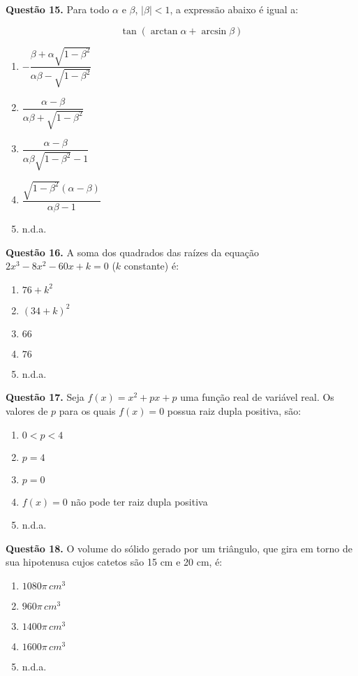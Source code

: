 \documentclass[11pt]{article}
\begin{document}
\textbf{Questão 15.} Para todo $\alpha$ e $\beta$, $|\beta| < 1$, a expressão abaixo é igual a:

$$
\tan (\arctan \alpha + \arcsin \beta)
$$


\begin{enumerate}[\bf A (\quad)]
    \item $-\dfrac{\beta + \alpha \sqrt{1-\beta^2}}{\alpha \beta - \sqrt{1 - \beta^2}}$
    \item $\dfrac{\alpha - \beta}{\alpha \beta + \sqrt{1 - \beta^2}}$
    \item $\dfrac{\alpha - \beta}{\alpha \beta \sqrt{1 - \beta^2} - 1}$
    \item $\dfrac{\sqrt{1-\beta^2}(\alpha - \beta)}{\alpha \beta - 1}$
    \item n.d.a.
\end{enumerate}

\textbf{Questão 16.} A soma dos quadrados das raízes da equação $2x^3 - 8x^2 - 60x + k = 0$ ($k$ constante) é:

\begin{multicols}{3}
    \begin{enumerate}[\bf A (\quad)]
        \item $76 + k^2$
        \item $(34 + k)^2$
        \item $66$
        \item $76$
        \item n.d.a.
    \end{enumerate}
\end{multicols}

\textbf{Questão 17.} Seja  $f(x)  =  x^2  +  px  +  p$  uma  função  real  de  variável  real.  Os  valores  de  $p$  para  os  quais  $f(x)  =  0$  possua  raiz  dupla positiva, são:

\begin{enumerate}[\bf A (\quad)]
    \item $0 < p < 4$
    \item $p = 4$
    \item $p = 0$
    \item $f(x) = 0$ não pode ter raiz dupla positiva
    \item n.d.a.
\end{enumerate}

\textbf{Questão 18.} O volume do sólido gerado por um triângulo, que gira em torno de sua hipotenusa cujos catetos são 15 cm e 20 cm, é:


\begin{enumerate}[\bf A (\quad)]
    \item $1080\pi \, cm^3$
    \item $960\pi \, cm^3$
    \item $1400\pi \, cm^3$
    \item $1600\pi \, cm^3$
    \item n.d.a.
\end{enumerate}
\end{document}
